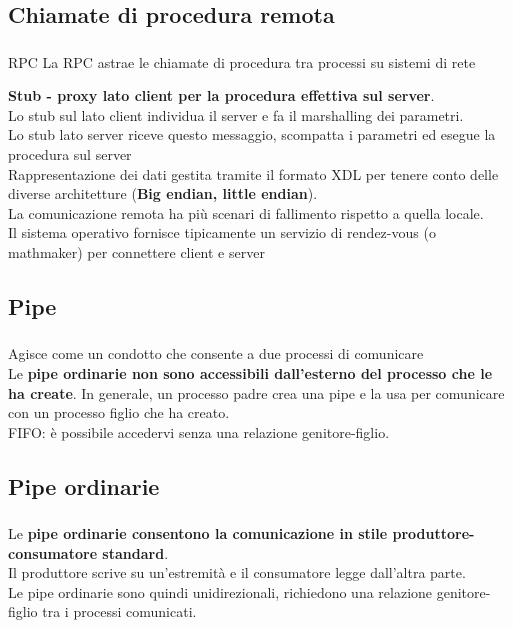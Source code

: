 \documentclass{beamer}
\newenvironment{mainframe}{
	\begin{frame}
		\frametitle{\insertsubsection}
		\framesubtitle{\insertsection}
	}{
	\end{frame}
}
\begin{document}
\subsection{Chiamate di procedura remota}
\begin{mainframe}
	\begin{block}{RPC}
		La RPC astrae le chiamate di procedura tra processi su sistemi di rete
	\end{block}
	\textbf{Stub - proxy lato client per la procedura effettiva sul server}.\\
	Lo stub sul lato client individua il server e fa il marshalling dei parametri.\\
	Lo stub lato server riceve questo messaggio, scompatta i parametri ed esegue la procedura sul server\\
	Rappresentazione dei dati gestita tramite il formato XDL per tenere conto delle diverse architetture (\textbf{Big endian, little endian}).\\
	La comunicazione remota ha più scenari di fallimento rispetto a quella locale.\\
	Il sistema operativo fornisce tipicamente un servizio di rendez-vous (o mathmaker) per connettere client e server
\end{mainframe}
\subsection{Pipe}
\begin{mainframe}
	Agisce come un condotto che consente a due processi di comunicare\\
	Le \textbf{pipe ordinarie non sono accessibili dall'esterno del processo che le ha create}. In generale, un processo padre crea una pipe e la usa per comunicare con un processo figlio che ha creato.\\
	FIFO: è possibile accedervi senza una relazione genitore-figlio.
\end{mainframe}
\subsection{Pipe ordinarie}
\begin{mainframe}
	Le \textbf{pipe ordinarie consentono la comunicazione in stile produttore-consumatore standard}.\\
	Il produttore scrive su un'estremità e il consumatore legge dall'altra parte.\\
	Le pipe ordinarie sono quindi unidirezionali, richiedono una relazione genitore-figlio tra i processi comunicati.
\end{mainframe}
\end{document}
